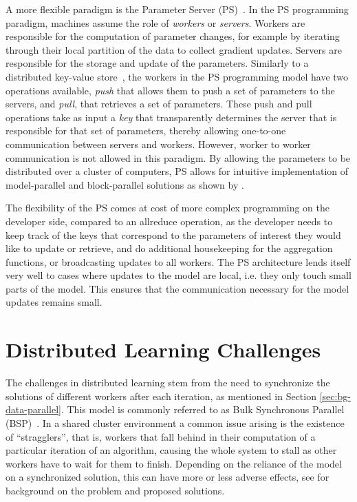 A more flexible paradigm is the Parameter Server (PS)~\cite{muPS, ps-osdi}. In the PS programming
paradigm, machines assume the role of \emph{workers} or \emph{servers}. Workers are
responsible for the computation of parameter changes, for example by iterating through
their local partition of the data to collect gradient updates. Servers are responsible
for the storage and update of the parameters.
Similarly to a distributed key-value store~\cite{dynamo}, the workers in the PS programming
model have two operations available, \emph{push} that allows them to push a set of
parameters to the servers, and \emph{pull}, that retrieves a set of parameters.
These push and pull operations take as input a \emph{key} that transparently determines
the server that is responsible for that set of parameters, thereby allowing
one-to-one communication between servers and workers. However, worker to
worker communication is not allowed in this paradigm.
By allowing the parameters to be
distributed over a cluster of computers, PS allows for intuitive implementation of
model-parallel and block-parallel solutions as shown by \citet{muPS, lightLDA}.

The flexibility of the PS comes at cost of more complex programming on the developer
side, compared to an allreduce operation, as the developer needs to keep track of the
keys that correspond to the parameters of interest they would like to update or
retrieve, and do additional housekeeping for the aggregation functions, or broadcasting
updates to all workers. The PS architecture lends itself very well to cases where updates to the model
are local, i.e. they only touch small parts of the model. This ensures that the communication
necessary for the model updates remains small.

\section{Distributed Learning Challenges}
\label{sec:bg-ml-challenges}

The challenges in distributed learning stem from the need to synchronize the solutions of different workers
after each iteration,
as mentioned in Section \ref{sec:bg-data-parallel}. This model is commonly referred to as
Bulk Synchronous Parallel (BSP)~\cite{stale-sync-ps}.
In a shared cluster environment a common issue arising is the existence of ``stragglers'', that is,
workers that fall behind in their computation of a particular iteration of an algorithm, causing
the whole system to stall as other workers have to wait for them to finish. Depending on the reliance
of the model on a synchronized solution, this can have more or less adverse effects, see
\citet{straggler-ml} for background on the problem and proposed solutions.

